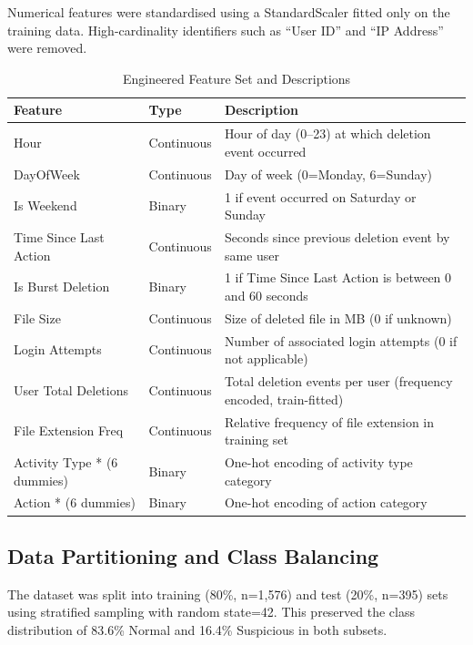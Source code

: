 Numerical features were standardised using a StandardScaler fitted only on the training data. High-cardinality identifiers such as “User ID” and “IP Address” were removed.



\begin{table}[t] %
\centering
\caption{Engineered Feature Set and Descriptions}
\label{tab:EFSD}
\begin{tabular}{| l | l | p{10cm} |} %
\hline
\textbf{Feature} & \textbf{Type} & \textbf{Description} \\ \hline
Hour & Continuous & Hour of day (0--23) at which deletion event occurred \\ \hline
DayOfWeek & Continuous & Day of week (0=Monday, 6=Sunday) \\ \hline
Is Weekend & Binary & 1 if event occurred on Saturday or Sunday \\ \hline
Time Since Last Action & Continuous & Seconds since previous deletion event by same user \\ \hline
Is Burst Deletion & Binary & 1 if Time Since Last Action is between 0 and 60 seconds \\ \hline
File Size & Continuous & Size of deleted file in MB (0 if unknown) \\ \hline
Login Attempts & Continuous & Number of associated login attempts (0 if not applicable) \\ \hline
User Total Deletions & Continuous & Total deletion events per user (frequency encoded, train-fitted) \\ \hline
File Extension Freq & Continuous & Relative frequency of file extension in training set \\ \hline
Activity Type * (6 dummies) & Binary & One-hot encoding of activity type category \\ \hline
Action * (6 dummies) & Binary & One-hot encoding of action category \\ \hline
\end{tabular}
\end{table}



\subsection{Data Partitioning and Class Balancing}
The dataset was split into training (80\%, n=1,576) and test (20\%, n=395) sets using stratified sampling with random state=42. This preserved the class distribution of 83.6\% Normal and 16.4\% Suspicious in both subsets.


